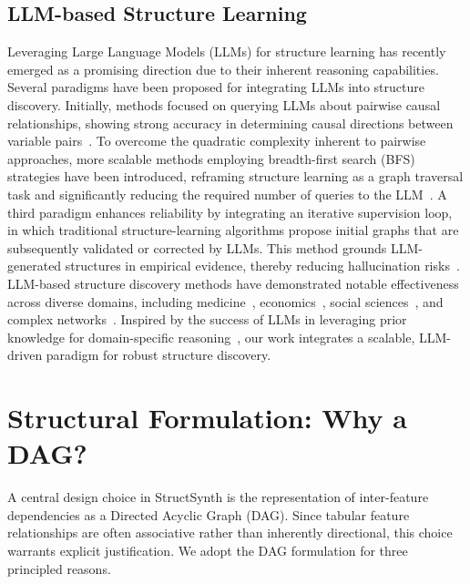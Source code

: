 \subsection{LLM-based Structure Learning}
Leveraging Large Language Models (LLMs) for structure learning has recently emerged as a promising direction due to their inherent reasoning capabilities. Several paradigms have been proposed for integrating LLMs into structure discovery. Initially, methods focused on querying LLMs about pairwise causal relationships, showing strong accuracy in determining causal directions between variable pairs~\cite{kiciman2023causal}. To overcome the quadratic complexity inherent to pairwise approaches, more scalable methods employing breadth-first search (BFS) strategies have been introduced, reframing structure learning as a graph traversal task and significantly reducing the required number of queries to the LLM~\cite{jiralerspong2024efficient, zanna2025fairness}. A third paradigm enhances reliability by integrating an iterative supervision loop, in which traditional structure-learning algorithms propose initial graphs that are subsequently validated or corrected by LLMs. This method grounds LLM-generated structures in empirical evidence, thereby reducing hallucination risks~\cite{ban2023causal}. LLM-based structure discovery methods have demonstrated notable effectiveness across diverse domains, including medicine~\cite{naik2024applying, antonucci2023zero, arsenyan2024large}, economics~\cite{causal4financial}, social sciences~\cite{manning2024automated}, and complex networks~\cite{mao2024critical}. Inspired by the success of LLMs in leveraging prior knowledge for domain-specific reasoning~\cite{liu2025agenthpo}, our work integrates a scalable, LLM-driven paradigm for robust structure discovery.

\section{Structural Formulation: Why a DAG?}
\label{sec:why_dag}

A central design choice in \textsf{StructSynth} is the representation of inter-feature dependencies as a Directed Acyclic Graph (DAG). Since tabular feature relationships are often associative rather than inherently directional, this choice warrants explicit justification. We adopt the DAG formulation for three principled reasons.


